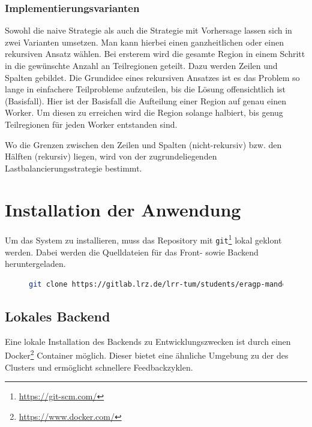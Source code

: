 \subsubsection{Implementierungsvarianten}

Sowohl die naive Strategie als auch die Strategie mit Vorhersage lassen sich in zwei Varianten umsetzen.
Man kann hierbei einen ganzheitlichen oder einen rekursiven Ansatz wählen.
Bei ersterem wird die gesamte Region in einem Schritt in die gewünschte Anzahl an Teilregionen geteilt.
Dazu werden Zeilen und Spalten gebildet.
Die Grundidee eines rekursiven Ansatzes ist es das Problem so lange in einfachere Teilprobleme aufzuteilen, bis die Lösung offensichtlich ist (Basisfall).
Hier ist der Basisfall die Aufteilung einer Region auf genau einen Worker.
Um diesen zu erreichen wird die Region solange halbiert, bis genug Teilregionen für jeden Worker entstanden sind.

Wo die Grenzen zwischen den Zeilen und Spalten (nicht-rekursiv) bzw. den Hälften (rekursiv) liegen, wird von der zugrundeliegenden Lastbalancierungsstrategie bestimmt.


\section{Installation der Anwendung}

Um das System zu installieren, muss das Repository mit \verb|git|\footnote{\url{https://git-scm.com/}} lokal geklont werden. Dabei werden die Quelldateien für
das Front- sowie Backend heruntergeladen.

\begin{figure}[h!]
	\begin{lstlisting}[language=bash, caption={Klonen des Repositorys}]
git clone https://gitlab.lrz.de/lrr-tum/students/eragp-mandelbrot.git
        \end{lstlisting}
\end{figure}

\subsection{Lokales Backend}
Eine lokale Installation des Backends zu Entwicklungszwecken ist durch einen Docker\footnote{\url{https://www.docker.com/}} Container möglich.
Dieser bietet eine ähnliche Umgebung zu der des Clusters und ermöglicht schnellere Feedbackzyklen.

